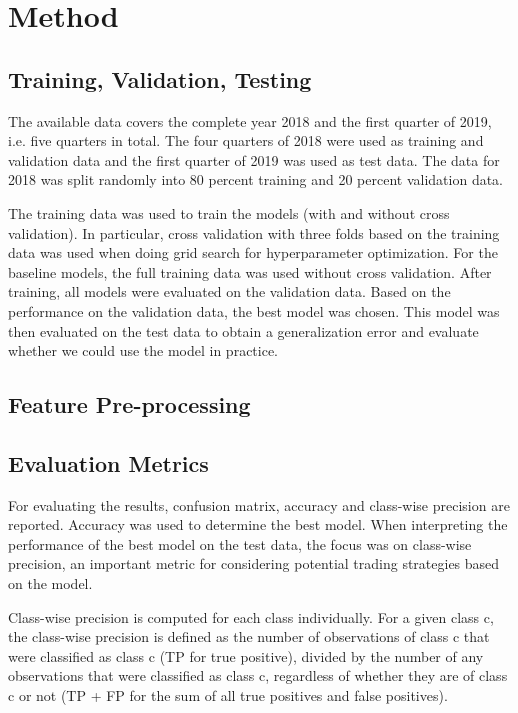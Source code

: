 \documentclass{article}
\begin{document}
	\section{Method}
	
	\subsection{Training, Validation, Testing}
	
	The available data covers the complete year 2018 and the first quarter of 2019, i.e. five quarters in total. The four quarters of 2018 were used as training and validation data and the first quarter of 2019 was used as test data. The data for 2018 was split randomly into 80 percent training and 20 percent validation data. 
	
	The training data was used to train the models (with and without cross validation). In particular, cross validation with three folds based on the training data was used when doing grid search for hyperparameter optimization. For the baseline models, the full training data was used without cross validation. After training, all models were evaluated on the validation data. Based on the performance on the validation data, the best model was chosen. This model was then evaluated on the test data to obtain a generalization error and evaluate whether we could use the model in practice. 
	
	\subsection{Feature Pre-processing}
	
	
	\subsection{Evaluation Metrics}
	
	For evaluating the results, confusion matrix, accuracy and class-wise precision are reported. Accuracy was used to determine the best model. When interpreting the performance of the best model on the test data, the focus was on class-wise precision, an important metric for considering potential trading strategies based on the model.
	
	Class-wise precision is computed for each class individually. For a given class c, the class-wise precision is defined as the number of observations of class c that were classified as class c (TP for true positive), divided by the number of any observations that were classified as class c, regardless of whether they are of class c or not (TP + FP for the sum of all true positives and false positives).
	
\end{document}
